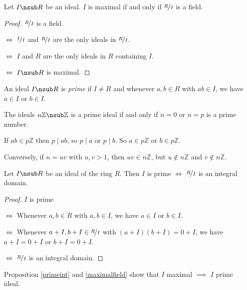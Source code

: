 \begin{proposition}
    Let \(I \nsub R\) be an ideal. \(I\) is maximal if and only if \(\nicefrac{R}{I}\) is a field.
    \label{maximalfield}
\end{proposition}
\begin{proof}
    \(\nicefrac{R}{I}\) is a field.

    \(\iff \) \(\nicefrac{I}{I}\) and \(\nicefrac{R}{I}\) are the only ideals in \(\nicefrac{R}{I}\).

    \(\iff \) \(I\) and \(R\) are the only ideals in \(R\) containing \(I\).

    \(\iff \) \(I \nsub R\) is maximal.
\end{proof}
\begin{definition}
    An ideal \(I \nsub R\) is \textit{prime} if \(I \neq R\) and whenever \(a,b \in R\) with \(ab \in I\), we have \(a \in I\) or \(b \in I\).
\end{definition}
\begin{example}
    The ideals \(n\mathbb{Z}\nsub \mathbb{Z}\) is a prime ideal if and only if \(n = 0\) or \(n = p\) is a prime number.

    If \(ab \in p\mathbb{Z}\) then \(p \mid ab\), so \(p \mid a\) or \(p \mid b\). So \(a \in p\mathbb{Z}\) or \(b \in p\mathbb{Z}\).

    Conversely, if \(n = uv\) with \(u, v > 1\), then \(uv \in n\mathbb{Z}\), but \(u \notin n\mathbb{Z}\) and \(v \notin n\mathbb{Z}\).
\end{example}
\begin{proposition}
    Let \(I \nsub R\) be an ideal of the ring \(R\). Then \(I\) is prime \(\iff \) \(\nicefrac{R}{I}\) is an integral domain.
    \label{primeint}
\end{proposition}
\begin{proof}
    \(I\) is prime

    \(\iff \) Whenever \(a,b \in R\) with \(a, b \in I\), we have \(a \in I\) or \(b \in I\).

    \(\iff \) Whenever \(a + I, b + I \in \nicefrac{R}{I}\) with \((a + I)(b + I) = 0 + I\), we have \(a + I = 0 + I\) or \(b + I = 0 + I\).

    \(\iff \) \(\nicefrac{R}{I}\) is an integral domain.
\end{proof}
\begin{remark}
    Proposition \eqref{primeint} and \eqref{maximalfield} show that \(I\) maximal \(\implies\) \(I\) prime ideal.
\end{remark}